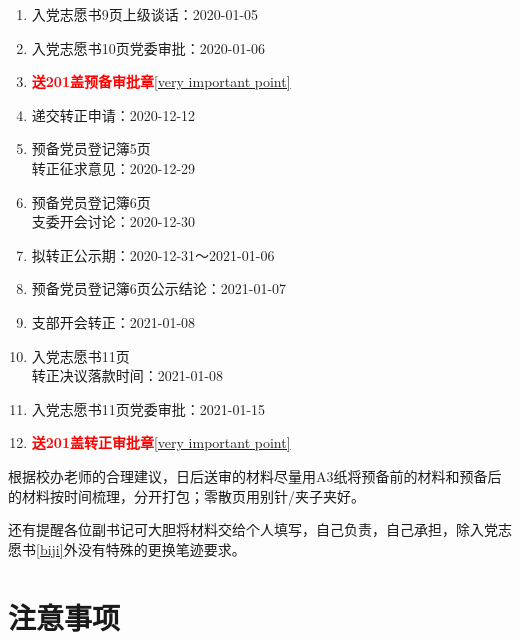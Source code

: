 \documentclass[fontset=windows]{ctexart}
\begin{document}
\begin{tcolorbox}
\begin{multicols}{2}
\begin{enumerate}
            \item 入党志愿书9页上级谈话：2020-01-05
            \item 入党志愿书10页党委审批：2020-01-06
            \item \textcolor{red}{\textbf{送201盖预备审批章}}\ref{very important point}
            \item 递交转正申请：2020-12-12
            \item 预备党员登记簿5页\\转正征求意见：2020-12-29
            \item 预备党员登记簿6页\\支委开会讨论：2020-12-30
            \item 拟转正公示期：2020-12-31～2021-01-06
            \item 预备党员登记簿6页公示结论：2021-01-07
            \item 支部开会转正：2021-01-08
            \item 入党志愿书11页\\转正决议落款时间：2021-01-08
            \item 入党志愿书11页党委审批：2021-01-15
            \item \textcolor{red}{\textbf{送201盖转正审批章}}\ref{very important point}
        \end{enumerate}
    \end{multicols}
\end{tcolorbox}

根据校办老师的合理建议，日后送审的材料尽量用A3纸将预备前的材料和预备后的材料按时间梳理，分开打包；零散页用别针/夹子夹好。

还有提醒各位副书记可大胆将材料交给个人填写，自己负责，自己承担，除入党志愿书\ref{biji}外没有特殊的更换笔迹要求。

\newpage
\section{注意事项}
\end{document}
